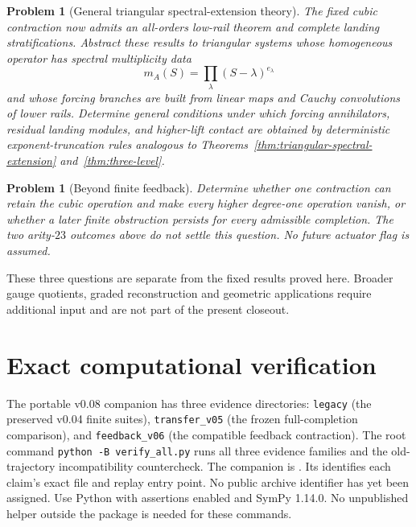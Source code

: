 \documentclass[11pt]{amsart}
\newtheorem{problem}[theorem]{Problem}
\begin{document}
\begin{problem}[General triangular spectral-extension theory]
The fixed cubic contraction now admits an all-orders low-rail theorem and complete landing stratifications.  Abstract these results to triangular systems whose homogeneous operator has spectral multiplicity data
\[
m_A(S)=\prod_\lambda(S-\lambda)^{e_\lambda}
\]
and whose forcing branches are built from linear maps and Cauchy convolutions of lower rails.  Determine general conditions under which forcing annihilators, residual landing modules, and higher-lift contact are obtained by deterministic exponent-truncation rules analogous to Theorems~\ref{thm:triangular-spectral-extension} and~\ref{thm:three-level}.
\end{problem}

\begin{problem}[Beyond finite feedback]
Determine whether one contraction can retain the cubic operation and make every
higher degree-one operation vanish, or whether a later finite obstruction
persists for every admissible completion. The two arity-$23$ outcomes above
do not settle this question. No future actuator flag is assumed.
\end{problem}

These three questions are separate from the fixed results proved here.
Broader gauge quotients, graded reconstruction and geometric applications
require additional input and are not part of the present closeout.

\clearpage
\appendix

\section{Exact computational verification}\label{sec:exact-verification}

The portable v0.08 companion has three evidence directories:
\texttt{legacy} (the preserved v0.04 finite suites),
\texttt{transfer\_v05} (the frozen full-completion comparison), and
\texttt{feedback\_v06} (the compatible feedback contraction).
The root command \texttt{python -B verify\_all.py} runs all three evidence
families and the old-trajectory incompatibility countercheck.
The companion is .
Its  identifies each claim's exact file and replay
entry point. No public archive identifier has yet been assigned.
Use Python with assertions enabled and SymPy 1.14.0.
No unpublished helper outside the package is needed for these commands.
\end{document}
